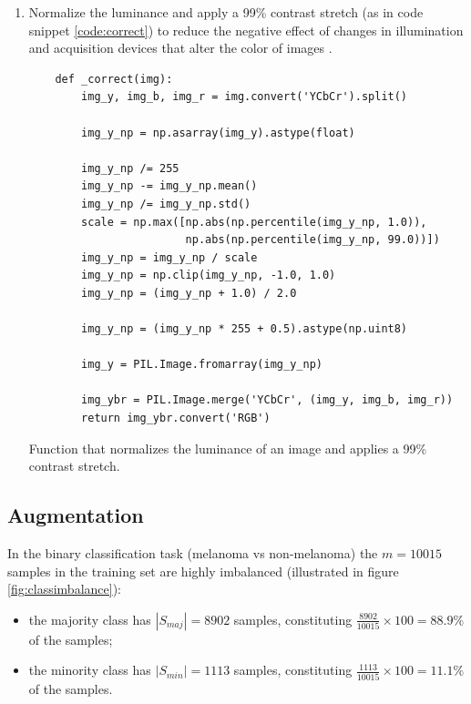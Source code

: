 \begin{enumerate}
\item Normalize the luminance and apply a 99\% contrast stretch (as in code snippet \ref{code:correct}) to reduce the negative effect of changes in illumination and acquisition devices that alter the color of images \cite{colorconstancy}.

    \begin{listing}[ht]
    \begin{verbatim}
    def _correct(img):
        img_y, img_b, img_r = img.convert('YCbCr').split()

        img_y_np = np.asarray(img_y).astype(float)

        img_y_np /= 255
        img_y_np -= img_y_np.mean()
        img_y_np /= img_y_np.std()
        scale = np.max([np.abs(np.percentile(img_y_np, 1.0)),
                        np.abs(np.percentile(img_y_np, 99.0))])
        img_y_np = img_y_np / scale
        img_y_np = np.clip(img_y_np, -1.0, 1.0)
        img_y_np = (img_y_np + 1.0) / 2.0

        img_y_np = (img_y_np * 255 + 0.5).astype(np.uint8)

        img_y = PIL.Image.fromarray(img_y_np)

        img_ybr = PIL.Image.merge('YCbCr', (img_y, img_b, img_r))
        return img_ybr.convert('RGB')
    \end{verbatim}
    \caption{Function that normalizes the luminance of an image and applies a 99\% contrast stretch.}
    \label{code:correct}
    \end{listing}
\end{enumerate}

\subsection{Augmentation}
\label{subsection:augmentation}

In the binary classification task (melanoma vs non-melanoma) the $m = 10015$ samples in the training set are highly imbalanced (illustrated in figure \ref{fig:classimbalance}):

\begin{itemize}
    \item the majority class has $|S_{maj}| = 8902$ samples, constituting $\frac{8902}{10015} \times 100 = 88.9\%$ of the samples;
    \item the minority class has $|S_{min}| = 1113$ samples, constituting $\frac{1113}{10015} \times 100 = 11.1\%$ of the samples.
\end{itemize}

